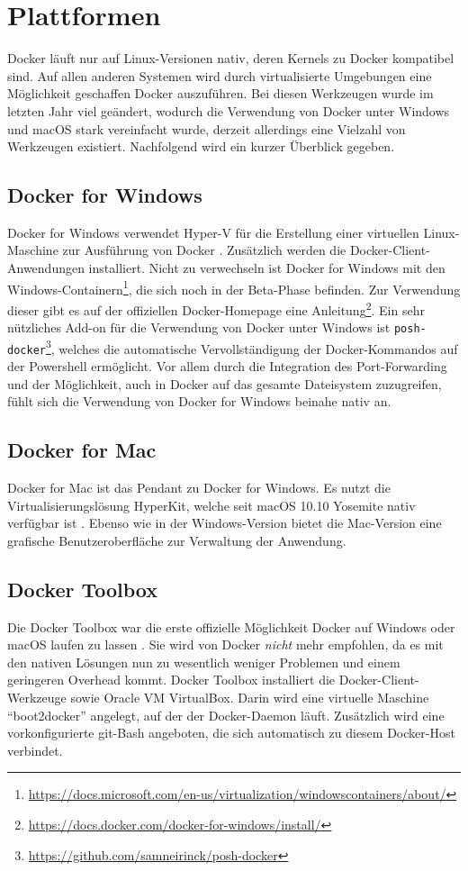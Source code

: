 \section{Plattformen}
\label{sec:docker-platforms}
Docker läuft nur auf Linux-Versionen nativ, deren Kernels zu Docker kompatibel sind.
Auf allen anderen Systemen wird durch virtualisierte Umgebungen eine Möglichkeit geschaffen Docker auszuführen.
Bei diesen Werkzeugen wurde im letzten Jahr viel geändert, wodurch die Verwendung von Docker unter Windows und macOS stark vereinfacht wurde, derzeit allerdings eine Vielzahl von Werkzeugen existiert. Nachfolgend wird ein kurzer Überblick gegeben.

\subsection{Docker for Windows}
\label{sec:docker-windows}
Docker for Windows verwendet Hyper-V für die Erstellung einer virtuellen Linux-Maschine zur Ausführung von Docker \autocite{docker-for-windows:online}.
Zusätzlich werden die Docker-Client-Anwendungen installiert.
Nicht zu verwechseln ist Docker for Windows mit den Windows-Containern\footnote{\url{https://docs.microsoft.com/en-us/virtualization/windowscontainers/about/}}, die sich noch in der Beta-Phase befinden.
Zur Verwendung dieser gibt es auf der offiziellen Docker-Homepage eine Anleitung\footnote{\url{https://docs.docker.com/docker-for-windows/install/}}.
Ein sehr nützliches Add-on für die Verwendung von Docker unter Windows ist \texttt{posh-docker}\footnote{\url{https://github.com/samneirinck/posh-docker}}, welches die automatische Vervollständigung der Docker-Kommandos auf der Powershell ermöglicht.
Vor allem durch die Integration des Port-Forwarding und der Möglichkeit, auch in Docker auf das gesamte Dateisystem zuzugreifen, fühlt sich die Verwendung von Docker for Windows beinahe nativ an.

\subsection{Docker for Mac}
\label{sec:docker-mac}
Docker for Mac ist das Pendant zu Docker for Windows.
Es nutzt die Virtualisierungslösung HyperKit, welche seit macOS 10.10 Yosemite nativ verfügbar ist \autocite{docker-for-mac:online}.
Ebenso wie in der Windows-Version bietet die Mac-Version eine grafische Benutzeroberfläche zur Verwaltung der Anwendung.

\subsection{Docker Toolbox}
\label{sec:docker-toolbox}
Die Docker Toolbox war die erste offizielle Möglichkeit Docker auf Windows oder macOS laufen zu lassen \autocite{docker-toolbox:online}.
Sie wird von Docker \emph{nicht} mehr empfohlen, da es mit den nativen Lösungen nun zu wesentlich weniger Problemen und einem geringeren Overhead kommt.
Docker Toolbox installiert die Docker-Client-Werkzeuge sowie Oracle VM VirtualBox.
Darin wird eine virtuelle Maschine "`boot2docker"' angelegt, auf der der Docker-Daemon läuft.
Zusätzlich wird eine vorkonfigurierte git-Bash angeboten, die sich automatisch zu diesem Docker-Host verbindet.

